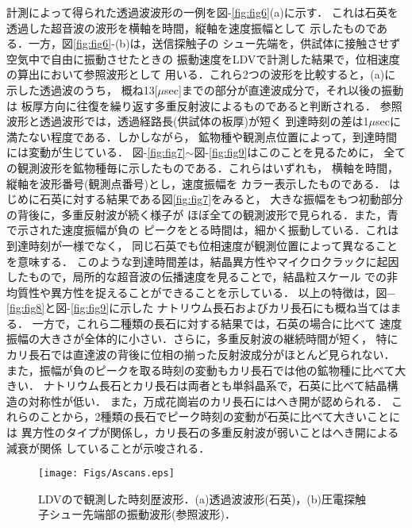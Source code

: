﻿%
計測によって得られた透過波波形の一例を図-\ref{fig:fig6}(a)に示す．
これは石英を透過した超音波の波形を横軸を時間，縦軸を速度振幅として
示したものである．一方，図\ref{fig:fig6}-(b)は，送信探触子の
シュー先端を，供試体に接触させず空気中で自由に振動させたときの
振動速度をLDVで計測した結果で，位相速度の算出において参照波形として
用いる．これら2つの波形を比較すると，(a)に示した透過波のうち，
概ね13[$\mu$sec]までの部分が直達波成分で，それ以後の振動は
板厚方向に往復を繰り返す多重反射波によるものであると判断される．
参照波形と透過波形では，透過経路長(供試体の板厚)が短く
到達時刻の差は1$\mu$secに満たない程度である．しかしながら，
鉱物種や観測点位置によって，到達時間には変動が生じている．
図-\ref{fig:fig7}$\sim$図-\ref{fig:fig9}はこのことを見るために，
全ての観測波形を鉱物種毎に示したものである．これらはいずれも，
横軸を時間，縦軸を波形番号(観測点番号)とし，速度振幅を
カラー表示したものである．
はじめに石英に対する結果である図\ref{fig:fig7}をみると，
大きな振幅をもつ初動部分の背後に，多重反射波が続く様子が
ほぼ全ての観測波形で見られる．また，青で示された速度振幅が負の
ピークをとる時間は，細かく振動している．これは到達時刻が一様でなく，
同じ石英でも位相速度が観測位置によって異なることを意味する．
このような到達時間差は，結晶異方性やマイクロクラックに起因
したもので，局所的な超音波の伝播速度を見ることで，結晶粒スケール
での非均質性や異方性を捉えることができることを示している．
以上の特徴は，図−\ref{fig:fig8}と図-\ref{fig:fig9}に示した
ナトリウム長石およびカリ長石にも概ね当てはまる．
一方で，これら二種類の長石に対する結果では，石英の場合に比べて
速度振幅の大きさが全体的に小さい．さらに，多重反射波の継続時間が短く，
特にカリ長石では直達波の背後に位相の揃った反射波成分がほとんど見られない．
また，振幅が負のピークを取る時刻の変動もカリ長石では他の鉱物種に比べて大きい．
ナトリウム長石とカリ長石は両者とも単斜晶系で，石英に比べて結晶構造の対称性が低い．
また，万成花崗岩のカリ長石にはへき開が認められる．
これらのことから，2種類の長石でピーク時刻の変動が石英に比べて大きいことには
異方性のタイプが関係し，カリ長石の多重反射波が弱いことはへき開による減衰が関係
していることが示唆される．
\begin{figure}
\begin{center}
	\texttt{[image: Figs/Ascans.eps]}
\caption{
	LDVので観測した時刻歴波形．(a)透過波波形(石英)，(b)圧電探触子シュー先端部の振動波形(参照波形)．
}
\label{fig:fig5}
\end{center}
\end{figure}
